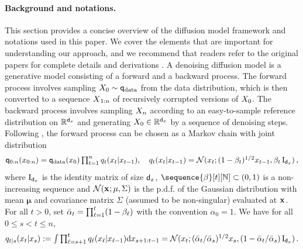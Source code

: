 \paragraph{Background and notations. } 
This section provides a concise overview of the diffusion model framework and notations used in this paper. We cover the elements that are important for understanding  our approach, and we recommend that readers refer to the original papers for complete details and derivations \cite{sohl2015deep, ho2020denoising,song2020score,song2021denoising}.
A denoising diffusion model is a generative model consisting of a forward and a backward process.
The forward process involves sampling $\state_0 \sim \fwmarg{\mathrm{data}}{}$ from the data distribution, which is then converted to a sequence $X{}_{1:n}$ of recursively corrupted versions of $X_0$.
The backward process involves sampling $X_n$ according to an easy-to-sample reference distribution on $\mathbb{R}^{{\mathsf{d}_x}}$ and generating $X_0 \in \mathbb{R}^{{\mathsf{d}_x}}$ by a sequence of denoising steps.
   Following \cite{sohl2015deep,song2021denoising}, the forward process can be chosen as a Markov chain with joint distribution
\begin{equation}
    \label{eq:forward_def}
    \fwmarg{0:n}{\chunk{\lstate}{0}{n}} = \fwmarg{\mathrm{data}}{\lstate_0} \textstyle\prod_{t=1}^{n} \fwtrans{t}{\lstate_{t-1}}{\lstate_{t}}, \quad \fwtrans{t}{\lstate_{t-1}}{\lstate_{t}}= \gauss( \lstate_t; (1 - \beta_t)^{1/2} \lstate_{t-1}, \beta_t \idm_{\dimx})\eqsp,
\end{equation}
where $\operatorname{I}_{{\mathsf{d}_x}}$ is the identity matrix of size ${\mathsf{d}_x}$,  $\sequence{\beta}[t][\nset] \subset (0,1)$ is a non-increasing sequence and $\mathcal{N}(\mathbf{x}_{}; \mathbf{\mu}, \Sigma)$ is the p.d.f. of the Gaussian distribution with mean $\mathbf{\mu}$ and covariance matrix $\Sigma$ (assumed to be non-singular) evaluated at $\mathbf{x}_{}$.
  For all $t > 0$, set $\alphacumprod{t}{} = \prod_{\ell=1}^t (1 - \beta_\ell)$ with the convention $\alpha_0 = 1$. We have for all $0 \leq s < t \leq n$,
  \begin{equation}
  \fwtrans{t|s}{\lstate_{s}}{\lstate_t} \eqdef \textstyle \int \prod_{\ell=s+1}^{t} \fwtrans{\ell}{\lstate_{\ell-1}}{\lstate_\ell} \rmd \chunk{\lstate}{s+1}{t-1} = \normpdf(\lstate_{t}; (\alphacumprod{t}{} / \alphacumprod{s}{})^{1/2} \lstate_{s}, (1 - \alphacumprod{t}{} / \alphacumprod{s}{}) \idm_{\dimx}) \eqsp.
  \end{equation} 
